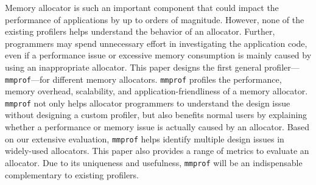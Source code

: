 Memory allocator is such an important component that could impact the performance of applications by up to orders of magnitude. However, none of the existing profilers helps understand the behavior of an allocator. Further, programmers may spend unnecessary effort in investigating the application code, even if a performance issue or excessive memory consumption is mainly caused by using an inappropriate allocator. This paper designs the first general profiler---\texttt{mmprof}---for different memory allocators. \texttt{mmprof} profiles the performance, memory overhead, scalability, and application-friendliness of a memory allocator. \texttt{mmprof} not only helps allocator programmers to understand the design issue without designing a custom profiler, but also benefits normal users by explaining whether a performance or memory issue is actually caused by an allocator. Based on our extensive evaluation, \texttt{mmprof} helps identify multiple design issues in widely-used allocators. This paper also provides a range of metrics to evaluate an allocator. Due to its uniqueness and usefulness, \texttt{mmprof} will be an indispensable complementary to existing profilers. 

 